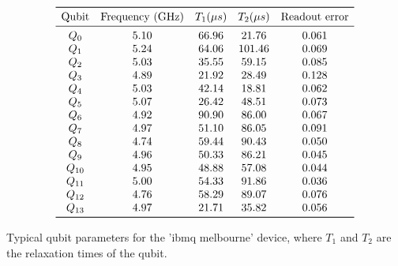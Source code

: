 \begin{center}
\begin{table}[h!]
\[
\begin{array}{*{5}c}
\toprule
\text{Qubit} 	&	\text{Frequency (GHz)}	&	T_1 ( \mu s)	&	T_2 ( \mu s)	&	\text{Readout error}	\\
\midrule
Q_0	&	5.10	&	66.96	&	21.76	&	0.061 \\
Q_1	&	5.24	&	64.06	&	101.46	&	0.069 \\
Q_2	&	5.03	&	35.55	&	59.15	&	0.085 \\
Q_3	&	4.89	&	21.92	&	28.49	&	0.128 \\
Q_4	&	5.03	&	42.14	&	18.81	&	0.062 \\
Q_5	&	5.07	&	26.42	&	48.51	&	0.073 \\
Q_6	&	4.92	&	90.90	&	86.00	&	0.067 \\
Q_7	&	4.97	&	51.10	&	86.05	&	0.091 \\
Q_8	&	4.74	&	59.44	&	90.43	&	0.050 \\
Q_9	&	4.96	&	50.33	&	86.21	&	0.045 \\
Q_{10}	&	4.95	&	48.88	&	57.08	&	0.044 \\
Q_{11}	&	5.00	&	54.33	&	91.86	&	0.036 \\
Q_{12}	&	4.76	&	58.29	&	89.07	&	0.076 \\
Q_{13}	&	4.97	&	21.71	&	35.82	&	0.056 \\
\bottomrule

\end{array}
\]
\caption{Typical qubit parameters for the 'ibmq melbourne' device, where $T_1$ and $T_2$ are the relaxation times of the qubit. }
\label{ibmq_16_mealburne_parameters}
\end{table}
\end{center}














